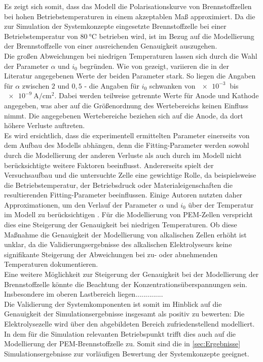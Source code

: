 Es zeigt sich somit, dass das Modell die Polarisationskurve von Brennstoffzellen bei hohen Betriebstemperaturen in einem akzeptablen Maß approximiert. Da die zur Simulation der Systemkonzepte eingesetzte Brennstoffzelle bei einer Betriebstemperatur von $\SI{80}{\degreeCelsius}$ betrieben wird, ist im Bezug auf die Modellierung der Brennstoffzelle von einer ausreichenden Genauigkeit auszugehen.\\
Die großen Abweichungen bei niedrigen Temperaturen lassen sich durch die Wahl der Parameter $\alpha$ und $i_0$ begründen. Wie von \citet{falcao_review_2020} gezeigt, variieren die in der Literatur angegebenen Werte der beiden Parameter stark. So liegen die Angaben für $\alpha$ zwischen $2$ und $0,5$ - die Angaben für $i_0$ schwanken von $\SI{e-3}{}$ bis $\SI{e-9}{\A\per\cm\squared}$. Dabei werden teilweise getrennte Werte für Anode und Kathode angegeben, was aber auf die Größenordnung des Wertebereichs keinen Einfluss nimmt. Die angegebenen Wertebereiche beziehen sich auf die Anode, da dort höhere Verluste auftreten.\\
Es wird ersichtlich, dass die experimentell ermittelten Parameter einerseits von dem Aufbau des Modells abhängen, denn die Fitting-Parameter werden sowohl durch die Modellierung der anderen Verluste als auch durch im Modell nicht berücksichtigte weitere Faktoren beeinflusst. Andererseits spielt der Versuchsaufbau und die untersuchte Zelle eine gewichtige Rolle, da beispielsweise die Betriebstemperatur, der Betriebsdruck oder Materialeigenschaften die resultierenden Fitting-Parameter beeinflussen.
Einige Autoren nutzten daher Approximationen, um den Verlauf der Parameter $\alpha$ und $i_0$ über der Temperatur im Modell zu berücksichtigen \citep{falcao_review_2020,milewski_modeling_2014}. Für die Modellierung von PEM-Zellen verspricht dies eine 
Steigerung der Genauigkeit bei niedrigen Temperaturen. Ob diese Maßnahme die Genauigkeit der Modellierung von alkalischen Zellen erhöht ist unklar, da die Validierungsergebnisse des alkalischen Elektrolyseurs keine signifikante Steigerung der Abweichungen bei zu- oder abnehmenden Temperaturen dokumentieren.\\
Eine weitere Möglichkeit zur Steigerung der Genauigkeit bei der Modellierung der Brennstoffzelle könnte die Beachtung der Konzentrationsüberspannungen sein. Insbesondere im oberen Lastbereich liegen..............\\

Die Validierung der Systemkomponenten ist somit im Hinblick auf die Genauigkeit der Simulationsergebnisse insgesamt als positiv zu bewerten: Die Elektrolysezelle wird über den abgebildeten Bereich zufriedenstellend modelliert. In dem für die Simulation relevanten Betriebspunkt trifft dies auch auf die Modellierung der PEM-Brennstoffzelle zu. Somit sind die in \ref{sec:Ergebnisse} Simulationsergebnisse zur vorläufigen Bewertung der Systemkonzepte geeignet.

